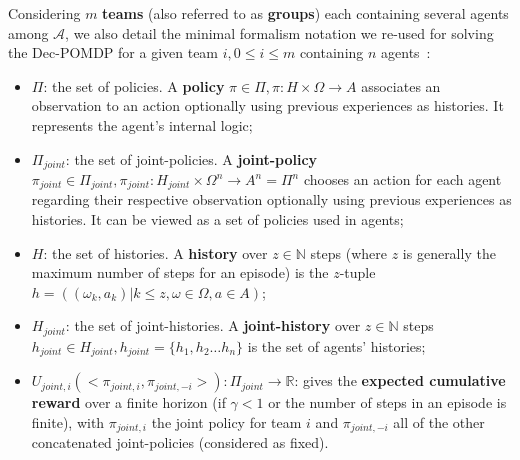 \documentclass[sigconf,anonymous]{aamas}
\begin{document}
Considering $m$ \textbf{teams} (also referred to as \textbf{groups}) each containing several agents among $\mathcal{A}$, we also detail the minimal formalism notation we re-used for solving the Dec-POMDP for a given team $i, 0 \leq i \leq m$ containing $n$ agents~\cite{Beynier2013,Albrecht2024}:

\begin{itemize}

  \item $\Pi$: the set of policies. A \textbf{policy} $\pi \in \Pi, \pi: H \times \Omega \rightarrow A$ associates an observation to an action optionally using previous experiences as histories. It represents the agent's internal logic;
  \item $\Pi_{joint}$: the set of joint-policies. A \textbf{joint-policy} $\pi_{joint} \in \Pi_{joint}, \pi_{joint}: H_{joint} \times \Omega^n \rightarrow A^n = \Pi^n$ chooses an action for each agent regarding their respective observation optionally using previous experiences as histories. It can be viewed as a set of policies used in agents;
  \item $H$: the set of histories. A \textbf{history} over $z \in \mathbb{N}$ steps (where $z$ is generally the maximum number of steps for an episode) is the $z$-tuple $h = ((\omega_{k}, a_{k}) | k \leq z, \omega \in \Omega, a \in A)$;
  \item $H_{joint}$: the set of joint-histories. A \textbf{joint-history} over $z \in \mathbb{N}$ steps $h_{joint} \in H_{joint}, h_{joint} = \{h_1,h_2 \dots h_n\}$ is the set of agents' histories;
  \item $U_{joint,i}(<\pi_{joint,i}, \pi_{joint,-i}>): \Pi_{joint} \rightarrow \mathbb{R}$: gives the \textbf{expected cumulative reward} over a finite horizon (if $\gamma < 1$ or the number of steps in an episode is finite), with $\pi_{joint,i}$ the joint policy for team $i$ and $\pi_{joint,-i}$ all of the other concatenated joint-policies (considered as fixed).
\end{itemize}
\end{document}
